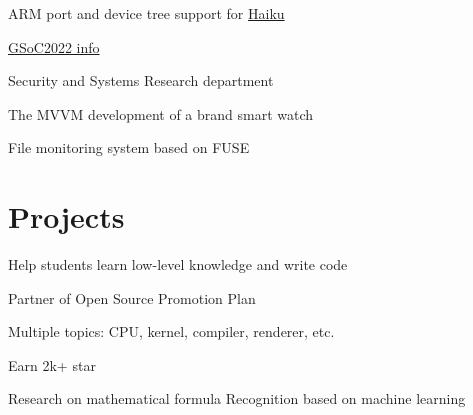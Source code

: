 \documentclass[]{deedy-resume-openfont}
\begin{document}
\begin{minipage}[t]{0.73\textwidth}
\begin{tightemize}
\item ARM port and device tree support for \href{https://www.haiku-os.org}{Haiku}
\item \href{https://summerofcode.withgoogle.com/programs/2022/projects/y2L1QWf1}{GSoC2022 info}
\end{tightemize}
\sectionsep

\begin{tightemize}
\item Security and Systems Research department
\item The MVVM development of a brand smart watch
\item File monitoring system based on FUSE
\end{tightemize}
\sectionsep


\section{Projects}
\begin{tightemize}
    \item Help students learn low-level knowledge and write code
    \item Partner of Open Source Promotion Plan
    \item Multiple topics: CPU, kernel, compiler, renderer, etc.
    \item Earn 2k+ star
    \end{tightemize}
\sectionsep

\begin{tightemize}
    \item Research on mathematical formula Recognition based on machine learning
    \end{tightemize}
\sectionsep



\end{minipage}
\end{document}
